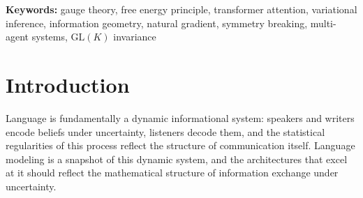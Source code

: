 \documentclass[twoside,11pt]{article}
\begin{document}
\begin{abstract}
We validate the unreduced theory by training a $\mathrm{GL}(K)$ gauge transformer on WikiText-103 using only KL divergences, gauge transport, and natural gradient dynamics (without learned attention projections, MLPs, or pointwise activation functions such as ReLU or GELU). The model achieves test perplexity 71.6 without neural components, outperforming a standard transformer at matched embedding dimension by $1.66\times$ (PPL~118.6 at $d_{\text{model}} = 90$) while approaching the performance of a parameter-matched standard transformer (PPL~48.5 at $d_{\text{model}} = 1{,}280$, requiring $14\times$ the embedding dimension). The learned gauge frames develop a dual structure: categorical separation in a low-dimensional subspace with within-category diversification in the bulk. We separately validate the degenerate-limit predictions on frozen BERT across 105 diverse passages, confirming quantitative agreement between KL-based and dot-product attention (grand mean $r = 0.804$ at the predicted optimal temperature, 95\% CI $[0.771, 0.838]$, with cross-passage SE $< 0.02$ for all 144 heads). Both architectures operate in the flat bundle limit with trivially vanishing holonomy: a geometric regime we hypothesize is matched to the approximately path-independent semantic transport that compositional language requires.
\end{abstract}

\noindent\textbf{Keywords:} gauge theory, free energy principle, transformer attention, variational inference, information geometry, natural gradient, symmetry breaking, multi-agent systems, $\mathrm{GL}(K)$ invariance

\section{Introduction}

Language is fundamentally a dynamic informational system: speakers and writers encode beliefs under uncertainty, listeners decode them, and the statistical regularities of this process reflect the structure of communication itself. Language modeling is a snapshot of this dynamic system, and the architectures that excel at it should reflect the mathematical structure of information exchange under uncertainty.
\end{document}

